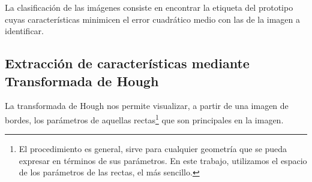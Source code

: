 \documentclass[conference,spanish,a4paper,10pt,oneside,final]{tfmpd}
\begin{document}
La clasificación de las imágenes consiste en encontrar la etiqueta del
prototipo cuyas características minimicen el error cuadrático medio con las de
la imagen a identificar.

%
%
\subsection*{Extracción de características mediante Transformada de Hough}
La transformada de Hough nos permite visualizar, a partir de una imagen de
bordes, los parámetros de aquellas rectas\footnote{El procedimiento es general,
sirve para cualquier geometría que se pueda expresar en términos de sus
parámetros. En este trabajo, utilizamos el espacio de los parámetros de las
rectas, el más sencillo.}
que son principales en la imagen.
\end{document}
